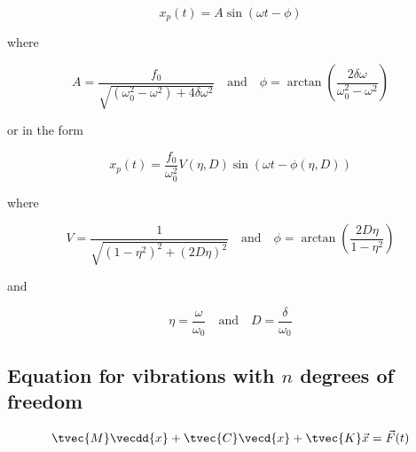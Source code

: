 \documentclass[10pt,a4paper]{scrartcl}
\begin{document}
\begin{multicols*}{2}
\begin{equation*}
x_p(t)=A\sin(\omega t-\phi)
\end{equation*}

where

\begin{equation*}
A=\frac{f_0}{\sqrt{(\omega_0^2-\omega^2)+4\delta\omega^2}}\quad\text{and}\quad\phi=\arctan\left(\frac{2\delta \omega}{\omega_0^2-\omega^2}\right)
\end{equation*}

or in the form

\begin{equation*}
x_p(t)=\frac{f_0}{\omega_0^2}V(\eta,D)\sin(\omega t-\phi(\eta, D))
\end{equation*}

where 

\begin{equation*}
V=\frac{1}{\sqrt{(1-\eta^2)^2+(2D\eta)^2}}\quad\text{and}\quad\phi=\arctan\left(\frac{2D\eta}{1-\eta^2}\right)
\end{equation*}

and

\begin{equation*}
\eta=\frac{\omega}{\omega_0}\quad\text{and}\quad D=\frac{\delta}{\omega_0}
\end{equation*}



\subsection{Equation for vibrations with $n$ degrees of freedom}

\begin{equation*}
\tvec{M}\vecdd{x}+\tvec{C}\vecd{x}+\tvec{K}\vec{x}=\vec{F}(t)
\end{equation*}



\end{multicols*}
\end{document}

